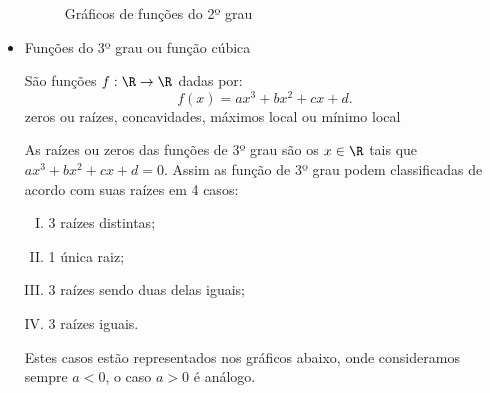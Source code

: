 \begin{itemize}
\begin{figure}[H]
   \caption{Gráficos de funções do 2º grau}
\end{figure}

  \newpage
 \item Funções do 3º grau ou função cúbica

 São funções $f: \R \rightarrow \R$ dadas por:
 \[f(x)= ax^3 + bx^2 + cx + d .\]
 {\color{red} zeros ou raízes, concavidades, máximos local ou mínimo local}

 As raízes ou zeros das funções de 3º grau são os $x \in \R$ tais que $ax^3 + bx^2 + cx + d=0$. Assim as função de 3º grau podem classificadas de acordo com suas raízes em 4 casos:
 \begin{enumerate}[(I)]
  \item 3 raízes distintas;
  \item 1 única raiz;
  \item 3 raízes sendo duas delas iguais;
  \item 3 raízes iguais.
 \end{enumerate}
 Estes casos estão representados nos gráficos abaixo, onde consideramos sempre $a< 0$, o caso $a> 0$ é análogo.



\end{itemize}
